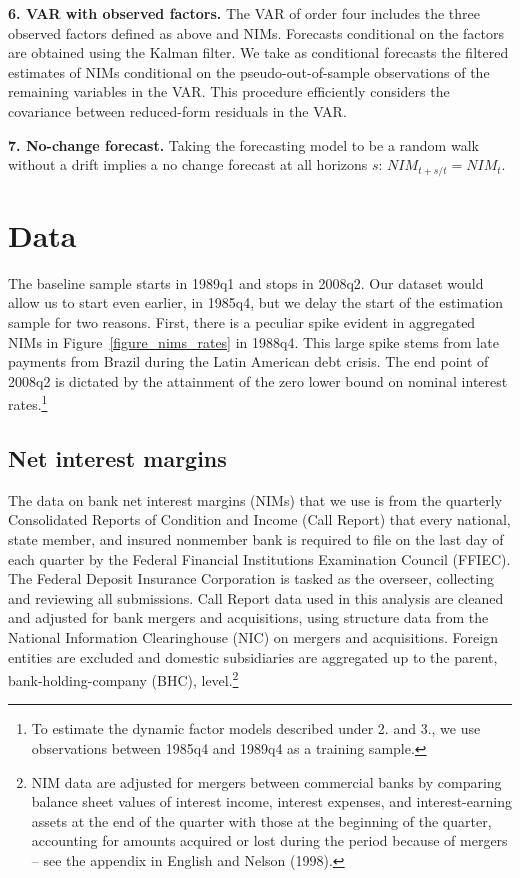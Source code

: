 \documentclass[11pt]{article}
\renewcommand{\baselinestretch}{1.5}
\begin{document}
\noindent \textbf{6. VAR with observed factors.}  The VAR of order four includes the three observed factors defined as above and NIMs. Forecasts conditional on the factors are obtained using the Kalman filter. We take as conditional forecasts the filtered estimates of NIMs conditional on the pseudo-out-of-sample observations of the remaining variables in the VAR. This procedure efficiently considers the  covariance between reduced-form residuals in the VAR.


\noindent \textbf{7. No-change forecast.} Taking the forecasting model to be a random walk without a drift implies a no change forecast at all horizons $s$: $NIM_{t+s/t}=NIM_{t}${\normalsize . }


\section{Data}

The baseline sample starts in 1989q1 and stops in 2008q2. Our dataset would allow us to start even earlier, in 1985q4, but we delay the start of the estimation sample for two reasons.  First, there is a peculiar spike evident in aggregated NIMs in Figure~\ref{figure_nims_rates} in 1988q4.  This large spike stems from late payments from Brazil during the Latin American debt crisis. The end point of 2008q2 is dictated by the attainment of the zero lower bound on nominal interest rates.\renewcommand{\baselinestretch}{1.0}\footnote{To estimate the dynamic factor models described under 2. and 3., we use observations between 1985q4 and 1989q4 as a training sample.\vspace{0.05in}}\renewcommand{\baselinestretch}{1.5}

\subsection{Net interest margins}

\vspace{-0.1in} The data on bank net interest margins (NIMs) that we use is from the quarterly Consolidated Reports of Condition and Income (Call Report) that every national, state member, and insured nonmember bank is required to file on the last day of each quarter by the Federal Financial Institutions Examination Council (FFIEC). The Federal Deposit Insurance Corporation is tasked as the overseer, collecting and reviewing all submissions. Call Report data used in this analysis are cleaned and adjusted for bank mergers and acquisitions, using structure data from the National Information Clearinghouse (NIC) on mergers and acquisitions. Foreign entities are excluded and domestic subsidiaries are aggregated up to the parent, bank-holding-company (BHC), level.\renewcommand{\baselinestretch}{1.0}\footnote{NIM data are adjusted for mergers between commercial banks by comparing balance sheet values of interest income, interest expenses, and interest-earning assets at the end of the quarter with those at the beginning of the quarter, accounting for amounts acquired or lost during the period because of mergers -- see the appendix in English and Nelson (1998).\vspace{0.05in}}\renewcommand{\baselinestretch}{1.5}
\end{document}
